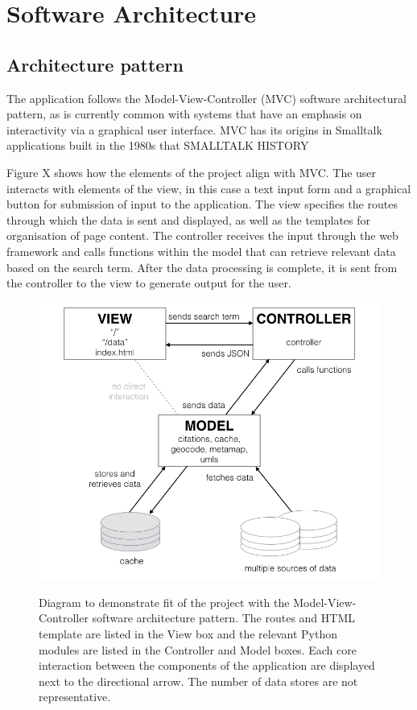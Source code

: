 \documentclass[Report.tex]{subfiles}
\begin{document}
\chapter{Software Architecture}
\section{Architecture pattern}
The application follows the Model-View-Controller (MVC) software architectural pattern, as is currently common with systems that have an emphasis on interactivity via a graphical user interface. MVC has its origins in Smalltalk applications built in the 1980s that SMALLTALK HISTORY

\noindent Figure X shows how the elements of the project align with MVC. The user interacts with elements of the view, in this case a text input form and a graphical button for submission of input to the application. The view specifies the routes through which the data is sent and displayed, as well as the templates for organisation of page content\cite{mozilla_mvc}. The controller receives the input through the web framework and calls functions within the model that can retrieve relevant data based on the search term.  After the data processing is complete, it is sent from the controller to the view to generate output for the user. \newline

\begin{figure}[h!]
	\includegraphics[width=\textwidth]{../lib/images/mvc.png}
	\label{fig:mvc}
	\caption{Diagram to demonstrate fit of the project with the Model-View-Controller software architecture pattern. The routes and HTML template are listed in the View box and the relevant Python modules are listed in the Controller and Model boxes. Each core interaction between the components of the application are displayed next to the directional arrow. The number of data stores are not representative.}
\end{figure}
\end{document}
